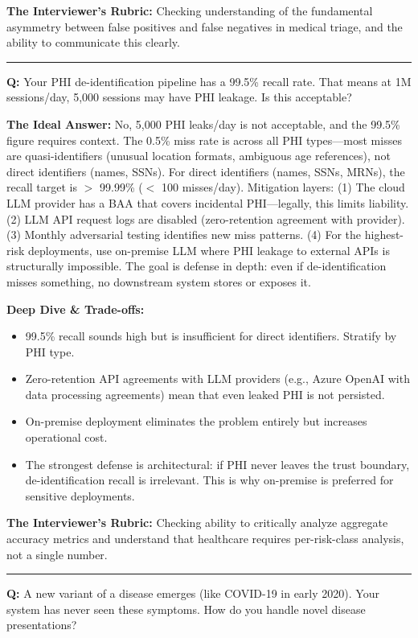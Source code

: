 \textbf{The Interviewer's Rubric:} Checking understanding of the fundamental asymmetry between false positives and false negatives in medical triage, and the ability to communicate this clearly.

\bigskip\hrule\bigskip

\textbf{Q:} Your PHI de-identification pipeline has a 99.5\% recall rate. That means at 1M sessions/day, 5,000 sessions may have PHI leakage. Is this acceptable?

\textbf{The Ideal Answer:} No, 5,000 PHI leaks/day is not acceptable, and the 99.5\% figure requires context. The 0.5\% miss rate is across all PHI types---most misses are quasi-identifiers (unusual location formats, ambiguous age references), not direct identifiers (names, SSNs). For direct identifiers (names, SSNs, MRNs), the recall target is $>$ 99.99\% ($<$ 100 misses/day). Mitigation layers: (1) The cloud LLM provider has a BAA that covers incidental PHI---legally, this limits liability. (2) LLM API request logs are disabled (zero-retention agreement with provider). (3) Monthly adversarial testing identifies new miss patterns. (4) For the highest-risk deployments, use on-premise LLM where PHI leakage to external APIs is structurally impossible. The goal is defense in depth: even if de-identification misses something, no downstream system stores or exposes it.

\textbf{Deep Dive \& Trade-offs:}
\begin{itemize}
  \item 99.5\% recall sounds high but is insufficient for direct identifiers. Stratify by PHI type.
  \item Zero-retention API agreements with LLM providers (e.g., Azure OpenAI with data processing agreements) mean that even leaked PHI is not persisted.
  \item On-premise deployment eliminates the problem entirely but increases operational cost.
  \item The strongest defense is architectural: if PHI never leaves the trust boundary, de-identification recall is irrelevant. This is why on-premise is preferred for sensitive deployments.
\end{itemize}

\textbf{The Interviewer's Rubric:} Checking ability to critically analyze aggregate accuracy metrics and understand that healthcare requires per-risk-class analysis, not a single number.

\bigskip\hrule\bigskip

\textbf{Q:} A new variant of a disease emerges (like COVID-19 in early 2020). Your system has never seen these symptoms. How do you handle novel disease presentations?

